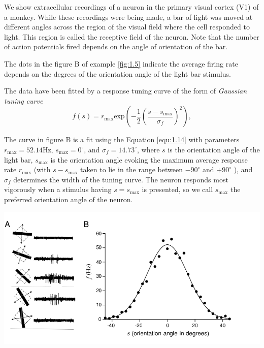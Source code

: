 \begin{exm}
  \label{fig:1.5}
   We show extracellular recordings of a neuron in the primary visual cortex (V1) of 
a monkey. While these recordings were being made, a
bar of light was moved at different angles across the region of the visual
field where the cell responded to light. This region is called the receptive 
field of the neuron. Note that the number of action potentials fired
depends on the angle of orientation of the bar.

The dots in the figure B of example \ref{fig:1.5} indicate the average firing rate depends on the degrees of the orientation angle of the light bar stimulus.

The data have been fitted by a response tuning curve of the form of \emph{Gaussian tuning curve}
\begin{equation}
  \label{equ:1.14}
  f(s)=r_{\text{max}}\text{exp}\left(-\frac{1}{2}\left(\frac{s-s_{\text{max}}}{\sigma_f}\right)^2\right),
\end{equation}

The curve  in figure B is a fit using
the Equation \ref{equ:1.14} with parameters $r_{\text{max}} = 52 . 14 $Hz, $s_{\text{max}}= 0 ^\circ$,
 and $\sigma_f= 14 . 73 ^\circ $,
where $s$ is the orientation angle of the light bar, $s_{\text{max}}$ is the orientation angle
evoking the maximum average response rate $r_{\text{max}}$ (with $s-s_{\text{max}} $ taken 
to lie in the range between $- 90^\circ $ and $+90^\circ$  ), and $\sigma_f$ determines the 
width of the tuning curve. The neuron responds most vigorously when a stimulus
having $s=s_{\text{max}} $ is presented, so we call $s_{\text{max}}$ the preferred orientation angle
of the neuron.

\begin{center}
  \includegraphics[scale=0.38]{./png/fig_1_5.png}
\end{center}
\end{exm}

